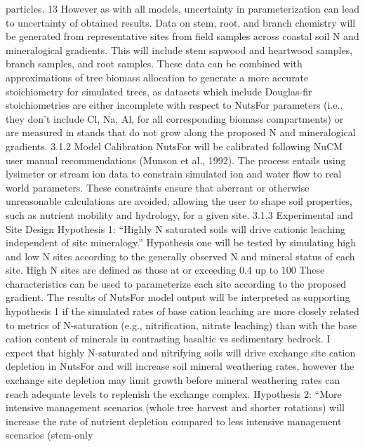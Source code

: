 \documentclass{article}
\begin{document}
particles.
13
However as with all models, uncertainty in parameterization can lead to uncertainty of obtained
results.
Data on stem, root, and branch chemistry will be generated from representative sites from field
samples across coastal soil N and mineralogical gradients. This will include stem sapwood and
heartwood samples, branch samples, and root samples. These data can be combined with
approximations of tree biomass allocation to generate a more accurate stoichiometry for
simulated trees, as datasets which include Douglas-fir stoichiometries are either incomplete with
respect to NutsFor parameters (i.e., they don’t include Cl, Na, Al, for all corresponding biomass
compartments) or are measured in stands that do not grow along the proposed N and
mineralogical gradients.
3.1.2 Model Calibration
NutsFor will be calibrated following NuCM user manual recommendations (Munson et al.,
1992). The process entails using lysimeter or stream ion data to constrain simulated ion and
water flow to real world parameters. These constraints ensure that aberrant or otherwise
unreasonable calculations are avoided, allowing the user to shape soil properties, such as nutrient
mobility and hydrology, for a given site.
3.1.3 Experimental and Site Design
Hypothesis 1:
“Highly N saturated soils will drive cationic leaching independent of site mineralogy.”
Hypothesis one will be tested by simulating high and low N sites according to the generally
observed N and mineral status of each site. High N sites are defined as those at or exceeding
0.4%
up to 100%
These characteristics can be used to parameterize each site according to the proposed gradient.
The results of NutsFor model output will be interpreted as supporting hypothesis 1 if the
simulated rates of base cation leaching are more closely related to metrics of N-saturation (e.g.,
nitrification, nitrate leaching) than with the base cation content of minerals in contrasting basaltic
vs sedimentary bedrock. I expect that highly N-saturated and nitrifying soils will drive exchange
site cation depletion in NutsFor and will increase soil mineral weathering rates, however the
exchange site depletion may limit growth before mineral weathering rates can reach adequate
levels to replenish the exchange complex.
Hypothesis 2:
“More intensive management scenarios (whole tree harvest and shorter rotations) will increase
the rate of nutrient depletion compared to less intensive management scenarios (stem-only
\end{document}
